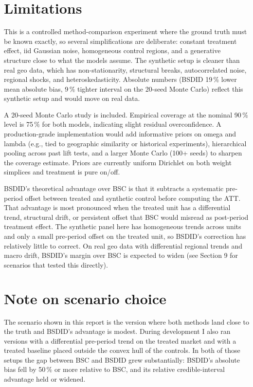 \documentclass[a4paper,11pt]{article}
\begin{document}
\section{Limitations}

This is a controlled method-comparison experiment where the ground
truth must be known exactly, so several simplifications are
deliberate: constant treatment effect, iid Gaussian noise,
homogeneous control regions, and a generative structure close to what
the models assume. The synthetic setup is cleaner than real geo data,
which has non-stationarity, structural breaks, autocorrelated noise,
regional shocks, and heteroskedasticity. Absolute numbers (BSDID
19\,\% lower mean absolute bias, 9\,\% tighter interval on the
20-seed Monte Carlo) reflect this synthetic setup and would move on
real data.

A 20-seed Monte Carlo study is included. Empirical coverage at the
nominal 90\,\% level is 75\,\% for both models, indicating slight
residual overconfidence. A production-grade implementation would add
informative priors on omega and lambda (e.g., tied to geographic
similarity or historical experiments), hierarchical pooling across
past lift tests, and a larger Monte Carlo (100+ seeds) to sharpen
the coverage estimate. Priors are currently uniform Dirichlet on both
weight simplices and treatment is pure on/off.

BSDID's theoretical advantage over BSC is that it subtracts a
systematic pre-period offset between treated and synthetic control
before computing the ATT. That advantage is most pronounced when the
treated unit has a differential trend, structural drift, or
persistent offset that BSC would misread as post-period treatment
effect. The synthetic panel here has homogeneous trends across units
and only a small pre-period offset on the treated unit, so BSDID's
correction has relatively little to correct. On real geo data with
differential regional trends and macro drift, BSDID's margin over
BSC is expected to widen (see Section 9 for scenarios that tested
this directly).

\section{Note on scenario choice}

The scenario shown in this report is the version where both methods
land close to the truth and BSDID's advantage is modest. During
development I also ran versions with a differential pre-period
trend on the treated market and with a treated baseline placed
outside the convex hull of the controls. In both of those setups
the gap between BSC and BSDID grew substantially: BSDID's absolute
bias fell by 50\,\% or more relative to BSC, and its relative
credible-interval advantage held or widened.
\end{document}
